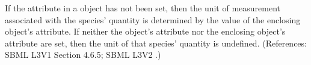 If the attribute  in a \Species object has not been
set, then the unit of measurement associated with the species' quantity is
determined by the value of the enclosing \Model object's
 attribute.  If neither the \Species object's
 attribute nor the enclosing \Model object's
 attribute are set, then the unit of that species'
quantity is undefined.  (References: SBML L3V1 Section 4.6.5; SBML L3V2
.)
